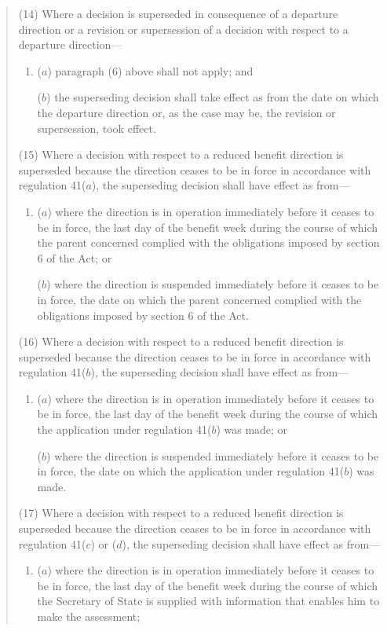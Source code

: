 \documentclass[12pt,a4paper]{article}
\begin{document}
\begin{quotation}
(14) Where a decision is superseded in consequence of a departure direction or a revision or supersession of a decision with respect to a departure direction---
\begin{enumerate}\item[]
($a$) paragraph (6) above shall not apply; and

($b$) the superseding decision shall take effect as from the date on which the departure direction or, as the case may be, the revision or supersession, took effect.
\end{enumerate}

(15) Where a decision with respect to a reduced benefit direction is superseded because the direction ceases to be in force in accordance with regulation 41($a$), the superseding decision shall have effect as from---
\begin{enumerate}\item[]
($a$) where the direction is in operation immediately before it ceases to be in force, the last day of the benefit week during the course of which the parent concerned complied with the obligations imposed by section 6 of the Act; or

($b$) where the direction is suspended immediately before it ceases to be in force, the date on which the parent concerned complied with the obligations imposed by section 6 of the Act.
\end{enumerate}

(16) Where a decision with respect to a reduced benefit direction is superseded because the direction ceases to be in force in accordance with regulation 41($b$), the superseding decision shall have effect as from---
\begin{enumerate}\item[]
($a$) where the direction is in operation immediately before it ceases to be in force, the last day of the benefit week during the course of which the application under regulation 41($b$) was made; or

($b$) where the direction is suspended immediately before it ceases to be in force, the date on which the application under regulation 41($b$) was made.
\end{enumerate}

(17) Where a decision with respect to a reduced benefit direction is superseded because the direction ceases to be in force in accordance with regulation 41($c$) or ($d$), the superseding decision shall have effect as from---
\begin{enumerate}\item[]
($a$) where the direction is in operation immediately before it ceases to be in force, the last day of the benefit week during the course of which the Secretary of State is supplied with information that enables him to make the assessment;


\end{enumerate}
\end{quotation}
\end{document}
